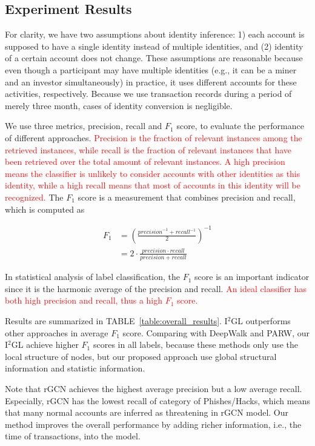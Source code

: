 \subsection{Experiment Results}
For clarity, we have two assumptions about identity inference: 1) each account is supposed to have a single identity instead of multiple identities, and (2) identity of a certain account does not change. These assumptions are reasonable because even though a participant may have multiple identities (e.g., it can be a miner and an investor simultaneously) in practice, it uses different accounts for these activities, respectively. Because we use transaction records during a period of merely three month, cases of identity conversion is negligible.

We use three metrics, precision, recall and $F_1$ score, to evaluate the performance of different approaches. \textcolor{red}{Precision is the fraction of relevant instances among the retrieved instances, while recall is the fraction of relevant instances that have been retrieved over the total amount of relevant instances. A high precision means the classifier is unlikely to consider accounts with other identities as this identity, while a high recall means that most of accounts in this identity will be recognized.} The $F_1$ score is a measurement that combines precision and recall, which is computed as

\begin{equation}
\begin{split}
F_1&=(\frac{{precision}^{-1}+{recall}^{-1}}{2})^{-1}\\
&=2\cdot\frac{precision \cdot recall}{precision + recall}
\end{split}
\end{equation}

In statistical analysis of label classification, the $F_1$ score is an important indicator since it is the harmonic average of the precision and recall. \textcolor{red}{An ideal classifier has both high precision and recall, thus a high $F_1$ score.}

Results are summarized in TABLE~\ref{table:overall_results}. I$^2$GL outperforms other approaches in average $F_1$ score. Comparing with DeepWalk and PARW, our I$^2$GL achieve higher $F_1$ scores in all labels, because these methods only use the local structure of nodes, but our proposed approach use global structural information and statistic information.

Note that rGCN achieves the highest average precision but a low average recall. Especially, rGCN has the lowest recall of category of Phishes/Hacks, which means that many normal accounts are inferred as threatening in rGCN model. Our method improves the overall performance by adding richer information, i.e., the time of transactions, into the model.

